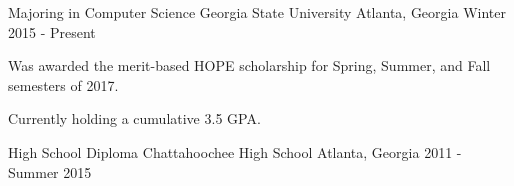 

\begin{cventries}

  \cventry
    {Majoring in Computer Science} %
    {Georgia State University} %
    {Atlanta, Georgia} %
    {Winter 2015 - Present} %
    {
      \begin{cvitems} %
        \item {Was awarded the merit-based HOPE scholarship for Spring, Summer, and Fall semesters of 2017.}
		\item {Currently holding a cumulative 3.5 GPA.}
      \end{cvitems}
    }

  \cventry
    {High School Diploma} %
    {Chattahoochee High School} %
    {Atlanta, Georgia} %
    {2011 - Summer 2015} %
    {
    }

\end{cventries}
